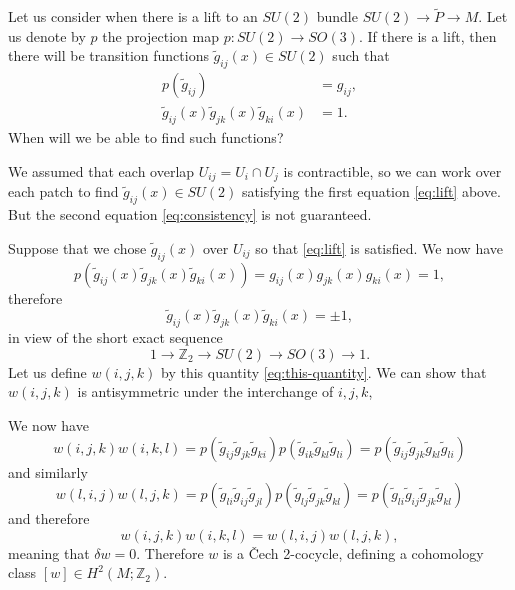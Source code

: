 \documentclass[12pt]{article}
\numberwithin{equation}{section}
\theoremstyle{remark}
\def\bZ{\mathbb{Z}}
\begin{document}
Let us consider when there is a lift to an $SU(2)$ bundle $SU(2)\to \tilde P\to M$.
Let us denote by $p$ the projection map $p:SU(2)\to SO(3)$.
If there is a lift, then there will be transition functions $\tilde g_{ij}(x)\in SU(2)$ such that \begin{align}
  p(\tilde g_{ij}) &= g_{ij}, \label{eq:lift}\\
  \tilde g_{ij}(x)\tilde g_{jk}(x)\tilde g_{ki}(x) &= 1.\label{eq:consistency}
\end{align}
When will we be able to find such functions?

We assumed that each overlap $U_{ij}=U_i\cap U_j$ is contractible, 
so we can work over each patch to find $\tilde g_{ij}(x)\in SU(2)$ satisfying 
the first equation \eqref{eq:lift} above.
But the second equation \eqref{eq:consistency} is not guaranteed. 

Suppose that we chose $\tilde g_{ij}(x)$ over $U_{ij}$ so that \eqref{eq:lift} is satisfied.
We now have \begin{equation}
p(\tilde g_{ij}(x)\tilde g_{jk}(x)\tilde g_{ki}(x)) = g_{ij}(x)g_{jk}(x)g_{ki}(x)=1,
\end{equation}
therefore \begin{equation}
\tilde g_{ij}(x)\tilde g_{jk}(x)\tilde g_{ki}(x) = \pm 1, \label{eq:this-quantity}
\end{equation} in view of the short exact sequence \begin{equation}
1\to \bZ_2 \to SU(2)\to SO(3)\to 1.
\end{equation}
Let us define $w(i,j,k)$ by this quantity \eqref{eq:this-quantity}.
We can show that $w(i,j,k)$ is antisymmetric under the interchange of $i,j,k$,

We now have \begin{equation}
w(i,j,k)w(i,k,l)= p(\tilde g_{ij} \tilde g_{jk}\tilde g_{ki} ) 
p(\tilde g_{ik} \tilde g_{kl} \tilde g_{li})
=p(\tilde g_{ij} \tilde g_{jk}\tilde g_{kl} \tilde g_{li})
\end{equation} and similarly \begin{equation}
  w(l,i,j)w(l,j,k)= p(\tilde g_{li} \tilde g_{ij}\tilde g_{jl} ) 
  p(\tilde g_{lj} \tilde g_{jk} \tilde g_{kl})
  =p(\tilde g_{li}\tilde g_{ij} \tilde g_{jk}\tilde g_{kl} )  
\end{equation} and therefore \begin{equation}
  w(i,j,k)w(i,k,l) = w(l,i,j)w(l,j,k),
\end{equation}  meaning that $\delta w=0$.
Therefore $w$ is a \v Cech 2-cocycle, defining a cohomology class $[w]\in H^2(M;\bZ_2)$.
\end{document}
